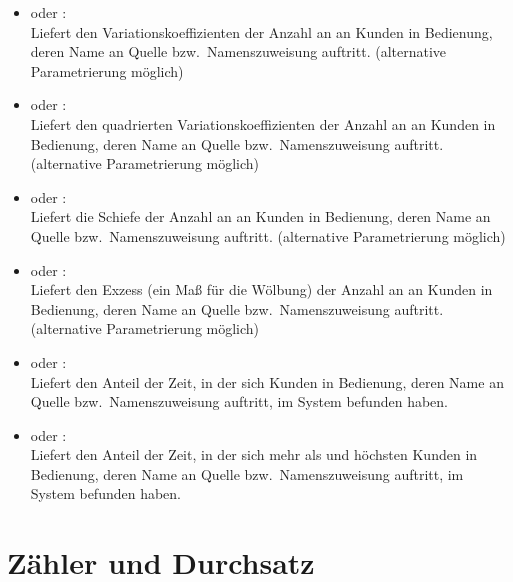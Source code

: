 \begin{itemize}
\item
{} oder :\\
Liefert den Variationskoeffizienten der Anzahl an an Kunden in Bedienung, deren Name an Quelle bzw.\ Namenszuweisung  auftritt.
(alternative Parametrierung möglich)

\item
{} oder :\\
Liefert den quadrierten Variationskoeffizienten der Anzahl an an Kunden in Bedienung, deren Name an Quelle bzw.\ Namenszuweisung  auftritt.
(alternative Parametrierung möglich)

\item
{} oder :\\
Liefert die Schiefe der Anzahl an an Kunden in Bedienung, deren Name an Quelle bzw.\ Namenszuweisung  auftritt.
(alternative Parametrierung möglich)

\item
{} oder :\\
Liefert den Exzess (ein Maß für die Wölbung) der Anzahl an an Kunden in Bedienung, deren Name an Quelle bzw.\ Namenszuweisung  auftritt.
(alternative Parametrierung möglich)

\item
{} oder :\\
Liefert den Anteil der Zeit, in der sich  Kunden in Bedienung, deren Name an Quelle bzw.\ Namenszuweisung  auftritt, im System befunden haben.

\item
{} oder :\\
Liefert den Anteil der Zeit, in der sich mehr als  und höchsten  Kunden in Bedienung, deren Name an Quelle bzw.\ Namenszuweisung  auftritt, im System befunden haben.

\end{itemize}





\section{Zähler und Durchsatz}


